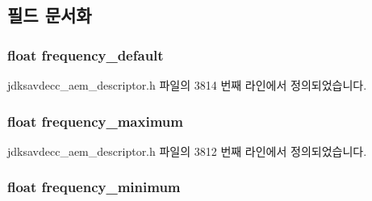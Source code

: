 \subsection{필드 문서화}
\subsubsection[{\texorpdfstring{frequency\+\_\+default}{frequency_default}}]{\setlength{\rightskip}{0pt plus 5cm}float frequency\+\_\+default}\hypertarget{structjdksavdecc__values__bode__plot_acf954095c1b3ebf63d5aee12a9193b77}{}\label{structjdksavdecc__values__bode__plot_acf954095c1b3ebf63d5aee12a9193b77}


jdksavdecc\+\_\+aem\+\_\+descriptor.\+h 파일의 3814 번째 라인에서 정의되었습니다.

\subsubsection[{\texorpdfstring{frequency\+\_\+maximum}{frequency_maximum}}]{\setlength{\rightskip}{0pt plus 5cm}float frequency\+\_\+maximum}\hypertarget{structjdksavdecc__values__bode__plot_a9a9464d23652680945738ee57530d4c9}{}\label{structjdksavdecc__values__bode__plot_a9a9464d23652680945738ee57530d4c9}


jdksavdecc\+\_\+aem\+\_\+descriptor.\+h 파일의 3812 번째 라인에서 정의되었습니다.

\subsubsection[{\texorpdfstring{frequency\+\_\+minimum}{frequency_minimum}}]{\setlength{\rightskip}{0pt plus 5cm}float frequency\+\_\+minimum}\hypertarget{structjdksavdecc__values__bode__plot_ac2f4b33e27fd68491ba8c615184f45b1}{}\label{structjdksavdecc__values__bode__plot_ac2f4b33e27fd68491ba8c615184f45b1}


